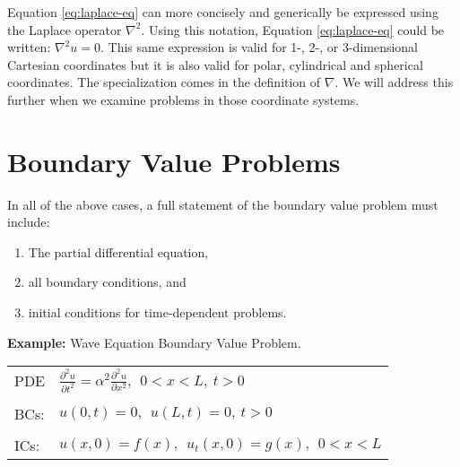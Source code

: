 Equation \ref{eq:laplace-eq} can more concisely and generically be expressed using the Laplace operator $\nabla^2$.
Using this notation, Equation \ref{eq:laplace-eq} could be written: $\nabla^2 u = 0$.  This same expression is valid for 1-, 2-, or 3-dimensional Cartesian coordinates but it is also valid for polar, cylindrical and spherical coordinates.  The specialization comes in the definition of $\nabla$.  We will address this further when we examine problems in those coordinate systems.

\section{Boundary Value Problems}
In all of the above cases, a full statement of the boundary value problem must include:
\begin{enumerate}
\item The partial differential equation,
\item all boundary conditions, and
\item initial conditions for time-dependent problems.
\end{enumerate}

\vspace{0.5cm}

\noindent\textbf{Example:} Wave Equation Boundary Value Problem.
\begin{table}
\begin{tabular}{l l}
PDE & $ \frac{\partial^2 u}{\partial t^2} = \alpha^2 \frac{\partial^2 u}{\partial x^2}, \ \ 0<x<L, \ t>0$\\
 & \\
BCs: & $u(0,t) = 0, \ \ u(L,t) = 0, \ t>0$ \\
 & \\
ICs: & $u(x,0)=f(x), \ \ u_t(x,0)=g(x), \ \ 0<x<L$ \\
\end{tabular}
\end{table}

